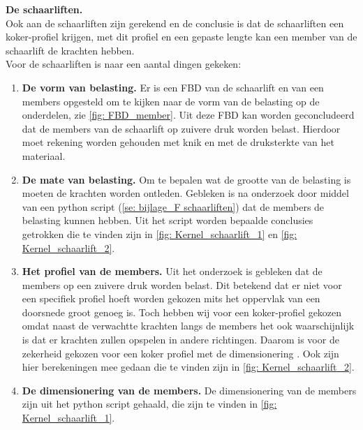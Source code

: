 \textbf{De schaarliften.}\\
Ook aan de schaarliften zijn gerekend en de conclusie is dat de schaarliften een koker-profiel krijgen, met dit profiel en een gepaste lengte kan een member van de schaarlift de krachten hebben.\\
Voor de schaarliften is naar een aantal dingen gekeken:\\
\vspace{\baselineskip}
\begin{enumerate}
    \item \textbf{De vorm van belasting.} Er is een FBD van de schaarlift en van een members opgesteld om te kijken naar de vorm van de belasting op de onderdelen, zie \cref{fig: FBD_member}. Uit deze FBD kan worden geconcludeerd dat de members van de schaarlift op zuivere druk worden belast. Hierdoor moet rekening worden gehouden met knik en met de druksterkte van het materiaal.\\
    \item \textbf{De mate van belasting.} Om te bepalen wat de grootte van de belasting is moeten de krachten worden ontleden. Gebleken is na onderzoek door middel van een python script (\cref{se: bijlage_F schaarliften}) dat de members de belasting kunnen hebben. Uit het script worden bepaalde conclusies getrokken die te vinden zijn in \cref{fig: Kernel_schaarlift_1} en \cref{fig: Kernel_schaarlift_2}.\\
    \item \textbf{Het profiel van de members.} Uit het onderzoek is gebleken dat de members op een zuivere druk worden belast. Dit betekend dat er niet voor een specifiek profiel hoeft worden gekozen mits het oppervlak van een doorsnede groot genoeg is. Toch hebben wij voor een koker-profiel gekozen omdat naast de verwachtte krachten langs de members het ook waarschijnlijk is dat er krachten zullen opspelen in andere richtingen. Daarom is voor de zekerheid gekozen voor een koker profiel met de dimensionering%
    . Ook zijn hier berekeningen mee gedaan die te vinden zijn in \cref{fig: Kernel_schaarlift_2}.\\
    \item \textbf{De dimensionering van de members.} De dimensionering van de members zijn uit het python script gehaald, die zijn te vinden in %
    \cref{fig: Kernel_schaarlift_1}.
\end{enumerate}
\vspace{\baselineskip}

